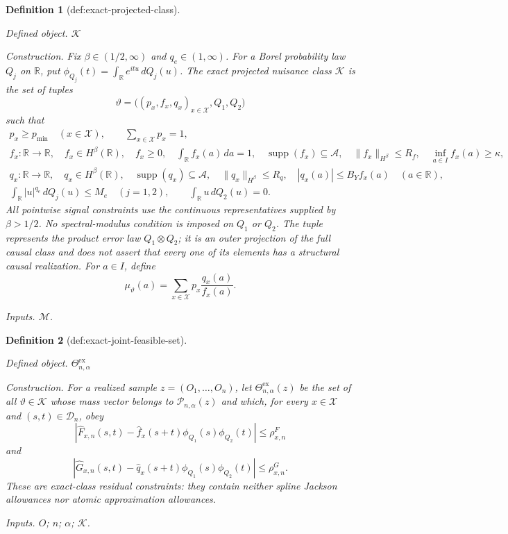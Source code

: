 \documentclass{article}
\newtheorem{definition}{Definition}
\begin{document}
\begin{definition}[def:exact-projected-class]\label{def:exact-projected-class}
\par\smallskip\noindent\emph{Defined object.} \(\mathscr K\)
\par\smallskip\noindent\emph{Construction.} Fix \(\beta\in(1/2,\infty)\) and \(q_e\in(1,\infty)\).  For a Borel
probability law \(Q_j\) on \(\mathbb R\), put
\(\phi_{Q_j}(t)=\int_{\mathbb R}e^{itu}\,dQ_j(u)\).  The exact projected
nuisance class \(\mathscr K\) is the set of tuples
\[
 \vartheta=\bigl((p_x,f_x,q_x)_{x\in\mathcal X},Q_1,Q_2\bigr)
\]
such that
\[
 \begin{gathered}
 p_x\ge p_{\min}\quad(x\in\mathcal X),\qquad
 \sum_{x\in\mathcal X}p_x=1,\\
 f_x:\mathbb R\to\mathbb R,\quad f_x\in H^\beta(\mathbb R),\quad f_x\ge0,\quad
 \int_{\mathbb R}f_x(a)\,da=1,\quad
 \operatorname{supp}(f_x)\subseteq\mathcal A,\quad
 \|f_x\|_{H^\beta}\le R_f,\quad
 \inf_{a\in I}f_x(a)\ge\kappa,\\
 q_x:\mathbb R\to\mathbb R,\quad q_x\in H^\beta(\mathbb R),\quad
 \operatorname{supp}(q_x)\subseteq\mathcal A,\quad
 \|q_x\|_{H^\beta}\le R_q,\quad
 |q_x(a)|\le B_Yf_x(a)\quad(a\in\mathbb R),\\
 \int_{\mathbb R}|u|^{q_e}\,dQ_j(u)\le M_e\quad(j=1,2),\qquad
 \int_{\mathbb R}u\,dQ_2(u)=0.
 \end{gathered}
\]
All pointwise signal constraints use the continuous representatives supplied by
\(\beta>1/2\).  No spectral-modulus condition is imposed on \(Q_1\) or
\(Q_2\).  The tuple represents the product error law \(Q_1\otimes Q_2\); it
is an outer projection of the full causal class and does not assert that every
one of its elements has a structural causal realization.  For \(a\in I\),
define
\[
 \mu_\vartheta(a)=\sum_{x\in\mathcal X}p_x\frac{q_x(a)}{f_x(a)}.
\]
\par\smallskip\noindent\emph{Inputs.} \(\mathcal M\).
\end{definition}

\begin{definition}[def:exact-joint-feasible-set]\label{def:exact-joint-feasible-set}
\par\smallskip\noindent\emph{Defined object.} \(\Theta^{\mathrm{ex}}_{n,\alpha}\)
\par\smallskip\noindent\emph{Construction.} For a realized sample \(z=(O_1,\ldots,O_n)\), let
\(\Theta^{\mathrm{ex}}_{n,\alpha}(z)\) be the set of all
\(\vartheta\in\mathscr K\) whose mass vector belongs to
\(\mathcal P_{n,\alpha}(z)\) and which, for every
\(x\in\mathcal X\) and \((s,t)\in\mathcal D_n\), obey
\[
 \left|\widehat F_{x,n}(s,t)-
 \widehat f_x(s+t)\phi_{Q_1}(s)\phi_{Q_2}(t)\right|
 \le\rho^F_{x,n}
\]
and
\[
 \left|\widehat G_{x,n}(s,t)-
 \widehat q_x(s+t)\phi_{Q_1}(s)\phi_{Q_2}(t)\right|
 \le\rho^G_{x,n}.
\]
These are exact-class residual constraints: they contain neither spline
Jackson allowances nor atomic approximation allowances.
\par\smallskip\noindent\emph{Inputs.} \(O\); \(n\); \(\alpha\); \(\mathscr K\).
\end{definition}
\end{document}
